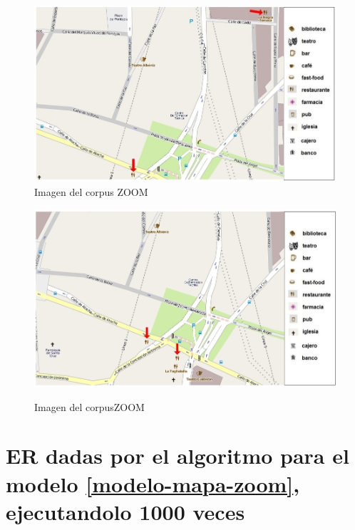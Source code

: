 \begin{figure}
\begin{minipage}[b]{0.5\linewidth}
\centering
\includegraphics[width=\textwidth]{images/corpus/mapa19.png}\\[0pt]
\caption{Imagen del corpus ZOOM}
\label{mapa19}
\end{minipage}
\hspace*{0cm}
\begin{minipage}[b]{0.5\linewidth}
\centering
\includegraphics[width=\textwidth]{images/corpus/mapa20.png}\\[0pt]
\caption{Imagen del corpusZOOM}
\label{mapa20}
\end{minipage}
\end{figure}

\chapter{ER dadas por el algoritmo para el modelo \ref{modelo-mapa-zoom}, ejecutandolo 1000 veces}
\label{er-mapa-zoom}


